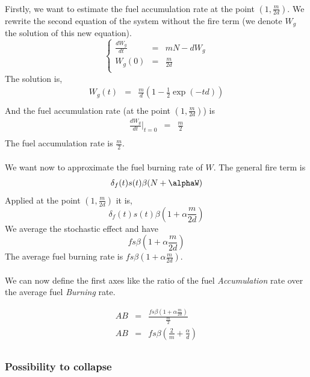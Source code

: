 \documentclass{article}
\begin{document}
\paragraph{}
Firstly, we want to estimate the fuel accumulation rate at the point $(1, \frac{m}{2d})$. We rewrite the second equation of the system without the fire term (we denote $W_g$ the solution of this new equation).
\[
\left\lbrace
\begin{array}{rcl}
\frac{d W_g}{dt} & = & mN-dW_g \\
W_g(0) & = & \frac{m}{2d} \\
\end{array}
\right.
\]
The solution is,
\[
\begin{array}{rcl}
W_g(t) & = & \frac{m}{d}(1-\frac{1}{2}\exp(-td)) \\
\end{array}
\]
And the fuel accumulation rate (at the point $(1, \frac{m}{2d})$) is 
\[
\begin{array}{rcl}
\frac{dW_g}{dt}|_{t=0} & = & \frac{m}{2} \\
\end{array}
\]
The fuel accumulation rate is $\frac{m}{2}$.


\paragraph{}
We want now to approximate the fuel burning rate of $W$. The general fire term is 
\[
\delta_f(t)s(t)\beta(N+\alphaW)
\]
Applied at the point $(1, \frac{m}{2d})$ it is,
\[
\delta_f(t)s(t)\beta(1+\alpha\frac{m}{2d})
\]
We average the stochastic effect and have
\[
fs\beta(1+\alpha\frac{m}{2d})
\]
The average fuel burning rate is $fs\beta(1+\alpha\frac{m}{2d})$.

\paragraph{}
We can now define the first axes like the ratio of the fuel \textit{Accumulation} rate over the average fuel \textit{Burning} rate.

\[
\begin{array}{rcl}
AB & = & \frac{fs\beta(1+\alpha\frac{m}{2d})}{\frac{m}{2}} \\
AB & = & fs\beta(\frac{2}{m}+\frac{\alpha}{d}) \\
\end{array}
\]


\subsubsection{Possibility to collapse}
\end{document}
